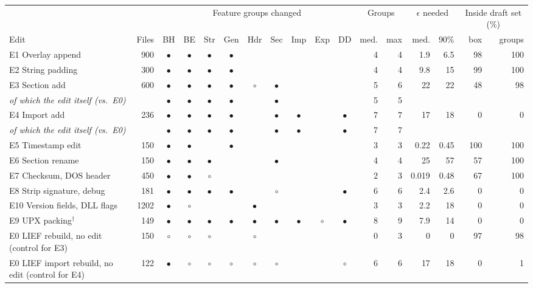 \begin{tabular}{lrcccccccccrrrrrr}
\toprule
 & & \multicolumn{9}{c}{Feature groups changed} & \multicolumn{2}{c}{Groups} & \multicolumn{2}{c}{$\epsilon$ needed} & \multicolumn{2}{c}{Inside draft set (\%)} \\
\cmidrule(lr){3-11}\cmidrule(lr){12-13}\cmidrule(lr){14-15}\cmidrule(lr){16-17}
Edit & Files & BH & BE & Str & Gen & Hdr & Sec & Imp & Exp & DD & med. & max & med. & 90\% & box & groups \\
\midrule
E1 Overlay append & 900 & $\bullet$ & $\bullet$ & $\bullet$ & $\bullet$ &  &  &  &  &  & 4 & 4 & 1.9 & 6.5 & 98 & 100 \\
E2 String padding & 300 & $\bullet$ & $\bullet$ & $\bullet$ & $\bullet$ &  &  &  &  &  & 4 & 4 & 9.8 & 15 & 99 & 100 \\
E3 Section add & 600 & $\bullet$ & $\bullet$ & $\bullet$ & $\bullet$ & $\circ$ & $\bullet$ &  &  &  & 5 & 6 & 22 & 22 & 48 & 98 \\
\quad\emph{of which the edit itself (vs.\ E0)} & & $\bullet$ & $\bullet$ & $\bullet$ & $\bullet$ &  & $\bullet$ &  &  &  & 5 & 5 & & & & \\
E4 Import add & 236 & $\bullet$ & $\bullet$ & $\bullet$ & $\bullet$ &  & $\bullet$ & $\bullet$ &  & $\bullet$ & 7 & 7 & 17 & 18 & 0 & 0 \\
\quad\emph{of which the edit itself (vs.\ E0)} & & $\bullet$ & $\bullet$ & $\bullet$ & $\bullet$ &  & $\bullet$ & $\bullet$ &  & $\bullet$ & 7 & 7 & & & & \\
E5 Timestamp edit & 150 & $\bullet$ & $\bullet$ &  & $\bullet$ &  &  &  &  &  & 3 & 3 & 0.22 & 0.45 & 100 & 100 \\
E6 Section rename & 150 & $\bullet$ & $\bullet$ & $\bullet$ &  &  & $\bullet$ &  &  &  & 4 & 4 & 25 & 57 & 57 & 100 \\
E7 Checksum, DOS header & 450 & $\bullet$ & $\bullet$ & $\circ$ &  &  &  &  &  &  & 2 & 3 & 0.019 & 0.48 & 67 & 100 \\
E8 Strip signature, debug & 181 & $\bullet$ & $\bullet$ & $\bullet$ & $\bullet$ &  & $\circ$ &  &  & $\bullet$ & 6 & 6 & 2.4 & 2.6 & 0 & 0 \\
E10 Version fields, DLL flags & 1202 & $\bullet$ & $\circ$ &  &  & $\bullet$ &  &  &  &  & 3 & 3 & 2.2 & 18 & 0 & 0 \\
\midrule
E9 UPX packing$^\dagger$ & 149 & $\bullet$ & $\bullet$ & $\bullet$ & $\bullet$ & $\bullet$ & $\bullet$ & $\bullet$ & $\circ$ & $\bullet$ & 8 & 9 & 7.9 & 14 & 0 & 0 \\
E0 LIEF rebuild, no edit (control for E3) & 150 & $\circ$ & $\circ$ & $\circ$ &  & $\circ$ &  &  &  &  & 0 & 3 & 0 & 0 & 97 & 98 \\
E0 LIEF import rebuild, no edit (control for E4) & 122 & $\bullet$ & $\circ$ & $\circ$ & $\circ$ & $\circ$ & $\circ$ &  &  & $\circ$ & 6 & 6 & 17 & 18 & 0 & 1 \\
\bottomrule
\end{tabular}
